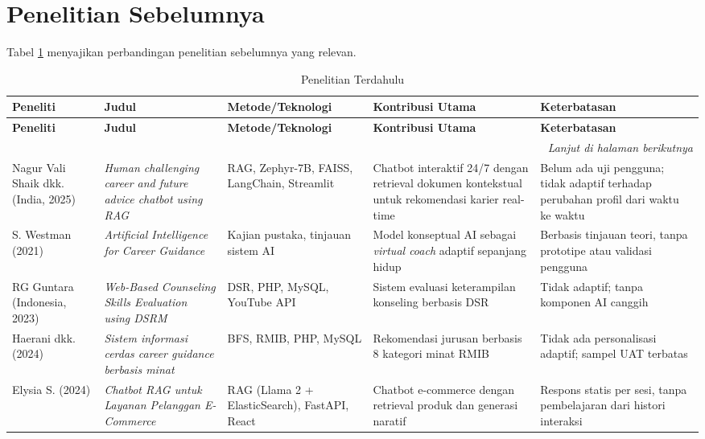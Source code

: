 \section{Penelitian Sebelumnya}
Tabel \ref{tab:related_work} menyajikan perbandingan penelitian sebelumnya yang relevan.

\begin{longtable}{p{2.5cm}p{3cm}p{3cm}p{3cm}p{3cm}}
\caption{Penelitian Terdahulu}
\label{tab:related_work} \\
\toprule
\textbf{Peneliti} & \textbf{Judul} & \textbf{Metode/Teknologi} & \textbf{Kontribusi Utama} & \textbf{Keterbatasan} \\
\midrule
\endfirsthead
\toprule
\textbf{Peneliti} & \textbf{Judul} & \textbf{Metode/Teknologi} & \textbf{Kontribusi Utama} & \textbf{Keterbatasan} \\
\midrule
\endhead
\midrule \multicolumn{5}{r}{\textit{Lanjut di halaman berikutnya}} \\
\endfoot
\bottomrule
\endlastfoot
Nagur Vali Shaik dkk. (India, 2025) &
  \textit{Human challenging career and future advice chatbot using RAG} &
  RAG, Zephyr-7B, FAISS, LangChain, Streamlit &
  Chatbot interaktif 24/7 dengan retrieval dokumen kontekstual untuk rekomendasi karier real-time &
  Belum ada uji pengguna; tidak adaptif terhadap perubahan profil dari waktu ke waktu \\[6pt]

S. Westman (2021) &
  \textit{Artificial Intelligence for Career Guidance} &
  Kajian pustaka, tinjauan sistem AI &
  Model konseptual AI sebagai \textit{virtual coach} adaptif sepanjang hidup &
  Berbasis tinjauan teori, tanpa prototipe atau validasi pengguna \\[6pt]

RG Guntara (Indonesia, 2023) &
  \textit{Web-Based Counseling Skills Evaluation using DSRM} &
  DSR, PHP, MySQL, YouTube API &
  Sistem evaluasi keterampilan konseling berbasis DSR &
  Tidak adaptif; tanpa komponen AI canggih \\[6pt]

Haerani dkk. (2024) &
  \textit{Sistem informasi cerdas career guidance berbasis minat} &
  BFS, RMIB, PHP, MySQL &
  Rekomendasi jurusan berbasis 8 kategori minat RMIB &
  Tidak ada personalisasi adaptif; sampel UAT terbatas \\[6pt]

Elysia S. (2024) &
  \textit{Chatbot RAG untuk Layanan Pelanggan E-Commerce} &
  RAG (Llama 2 + ElasticSearch), FastAPI, React &
  Chatbot e-commerce dengan retrieval produk dan generasi naratif &
  Respons statis per sesi, tanpa pembelajaran dari histori interaksi \\
\end{longtable}

